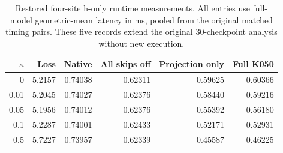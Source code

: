 \begin{table}[htbp]\centering\small
\caption{Restored four-site h-only runtime measurements. All entries use full-model geometric-mean latency in ms, pooled from the original matched timing pairs. These five records extend the original 30-checkpoint analysis without new execution.}\label{tab:h-only-runtime}
\begin{tabular}{@{}rrrrrr@{}}
\toprule
$\kappa$ & Loss & Native & All skips off & Projection only & Full K050 \\
\midrule
0 & 5.2157 & 0.74038 & 0.62311 & 0.59625 & 0.60366 \\
0.01 & 5.2045 & 0.74027 & 0.62376 & 0.58440 & 0.59216 \\
0.05 & 5.1956 & 0.74012 & 0.62376 & 0.55392 & 0.56180 \\
0.1 & 5.2287 & 0.74001 & 0.62433 & 0.52171 & 0.52931 \\
0.5 & 5.7227 & 0.73957 & 0.62339 & 0.45587 & 0.46225 \\
\bottomrule
\end{tabular}
\end{table}
